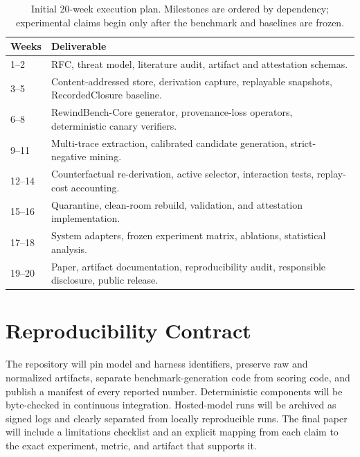 \documentclass[11pt]{article}
\begin{document}
\begin{table}[h]
\centering
\small
\caption{Initial 20-week execution plan. Milestones are ordered by dependency; experimental claims begin only after the benchmark and baselines are frozen.}
\label{tab:timeline}
\begin{tabularx}{\linewidth}{@{}lX@{}}
\toprule
Weeks & Deliverable \\
\midrule
1--2 & RFC, threat model, literature audit, artifact and attestation schemas. \\
3--5 & Content-addressed store, derivation capture, replayable snapshots, RecordedClosure baseline. \\
6--8 & RewindBench-Core generator, provenance-loss operators, deterministic canary verifiers. \\
9--11 & Multi-trace extraction, calibrated candidate generation, strict-negative mining. \\
12--14 & Counterfactual re-derivation, active selector, interaction tests, replay-cost accounting. \\
15--16 & Quarantine, clean-room rebuild, validation, and attestation implementation. \\
17--18 & System adapters, frozen experiment matrix, ablations, statistical analysis. \\
19--20 & Paper, artifact documentation, reproducibility audit, responsible disclosure, public release. \\
\bottomrule
\end{tabularx}
\end{table}

\section{Reproducibility Contract}

The repository will pin model and harness identifiers, preserve raw and normalized artifacts, separate benchmark-generation code from scoring code, and publish a manifest of every reported number. Deterministic components will be byte-checked in continuous integration. Hosted-model runs will be archived as signed logs and clearly separated from locally reproducible runs. The final paper will include a limitations checklist and an explicit mapping from each claim to the exact experiment, metric, and artifact that supports it.

\begingroup
\setlength{\emergencystretch}{3em}
\printbibliography[title={References}]
\endgroup
\end{document}
